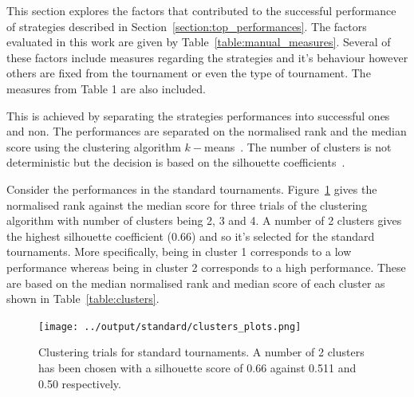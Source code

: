 \documentclass{article}
\begin{document}
This section explores the factors that contributed to the successful performance
of strategies described in Section~\ref{section:top_performances}.
The factors
evaluated in this work are given by Table~\ref{table:manual_measures}. Several
of these factors include measures regarding the strategies and it's behaviour
however others are fixed from the tournament or even the type of tournament. The
measures from Table 1 are also included.



This is achieved by
separating the strategies performances into successful ones and non. The performances
are separated on the normalised rank and the median score using the clustering
algorithm \(k-\)means~\cite{Arthur2007}. The number of clusters is not deterministic
but the decision is based on the silhouette coefficients~\cite{Rousseeuw1987}.

Consider the performances in the standard tournaments.
Figure~\ref{fig:standard_clusters} gives the normalised rank against the median
score for three trials of the clustering algorithm with number of clusters being
2, 3 and 4. A number of 2 clusters gives the highest silhouette coefficient (0.66)
and so it's selected for the standard tournaments. More specifically,
being in cluster 1 corresponds to a low performance whereas being in cluster
2 corresponds to a high performance. These are based on the median normalised
rank and median score of each cluster as shown in Table~\ref{table:clusters}.

\begin{figure}[!htbp]
    \centering
    \texttt{[image: ../output/standard/clusters\_plots.png]}
    \caption{Clustering trials for standard tournaments. A number of 2
    clusters has been chosen with a silhouette score of  0.66 against 0.511 and 0.50
    respectively.}\label{fig:standard_clusters}
\end{figure}

\begin{table}[!htbp]
    \centering
    \caption{Median normalised rank and median score of each cluster in standard tournaments.}
    \label{table:clusters}
\end{table}
\end{document}
